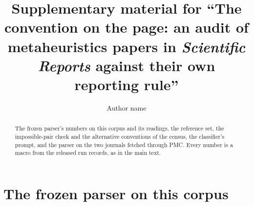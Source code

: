 \documentclass[preprint,review,12pt]{elsarticle}
\begin{document}
\begin{frontmatter}
\title{Supplementary material for ``The convention on the page: an audit of \nOListedSrep{} metaheuristics papers in \emph{Scientific Reports} against their own reporting rule''}
\author[1]{Author name}
\begin{abstract}
The frozen parser's numbers on this corpus and its readings, the reference set, the impossible-pair check and the alternative conventions of the census, the classifier's prompt, and the parser on the two journals fetched through PMC. Every number is a macro from the released run records, as in the main text.
\end{abstract}
\end{frontmatter}
\linenumbers

\renewcommand{\thesection}{S\arabic{section}}
\renewcommand{\thetable}{S\arabic{table}}

\section{The frozen parser on this corpus}
\label{app:parser}
\end{document}
